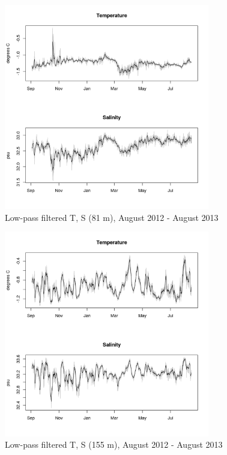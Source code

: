 \documentclass[12pt]{dforeport}
\begin{document}
\begin{figure}  
\centering
\includegraphics[width = 0.8\textwidth]{./figures/23_lpf_TS_81m_2012_2013.png}
\caption[Low-pass filtered T, S (81 m), 2012-2013]{Low-pass filtered T, S (81 m), August 2012 - August 2013}
\label{f:ctd_81_lpf_2012_2013}
\end{figure}

\begin{figure}  
\centering
\includegraphics[width = 0.8\textwidth]{./figures/24_lpf_TS_155m_2012_2013.png}
\caption[Low-pass filtered T, S (155 m), 2012-2013]{Low-pass filtered T, S (155 m), August 2012 - August 2013}
\label{f:ctd_155_lpf_2012_2013}
\end{figure}
\end{document}
